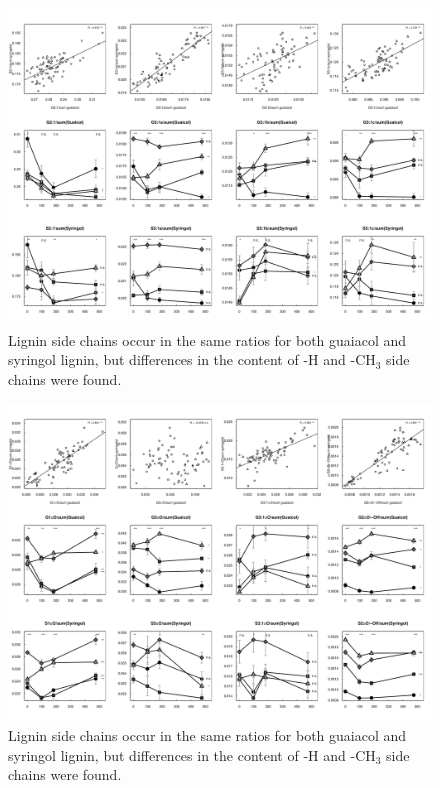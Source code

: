 \documentclass[preprint,review,12pt]{elsarticle}
\begin{document}
\begin{figure}
\centering
{}
\includegraphics{aap-sidechainratios2}
\caption{Lignin side chains occur in the same ratios for both guaiacol and syringol lignin, but differences in the content of -H and -CH$_3$ side chains were found.}
\label{fig:sidechainratios2}
\end{figure}
\begin{figure}
\centering
{}
\includegraphics{aap-sidechainratios3}
\caption{Lignin side chains occur in the same ratios for both guaiacol and syringol lignin, but differences in the content of -H and -CH$_3$ side chains were found.}
\label{fig:sidechainratios3}
\end{figure}
\end{document}
